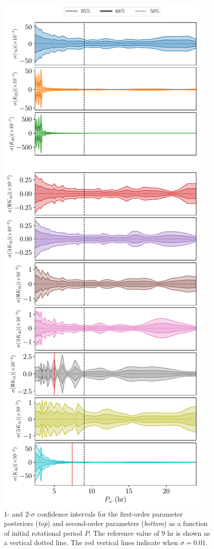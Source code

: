\documentclass[fleqn,usenatbib]{mnras}
\begin{document}
\begin{figure}
  \centering
  \includegraphics[height=0.89\textheight]{figs/scan-period.pdf}
  \caption{1- and 2-$\sigma$ confidence intervals for the first-order parameter posteriors (\textit{top}) and second-order parameters (\textit{bottom}) as a function of initial rotational period $P$. The reference value of 9 hr is shown as a vertical dotted line. The red vertical lines indicate when $\sigma = 0.01$.}
  \label{fig:scan-period}
\end{figure}
\end{document}
